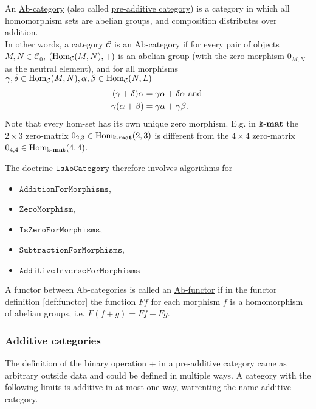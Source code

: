 \begin{definition}[Ab-category]
An \ul{Ab-category} (also called \ul{pre-additive category}) is a category in which all homomorphism sets are abelian groups,
and composition distributes over addition.\\
In other words, a category $\mathcal{C}$ is an Ab-category if for every pair of objects $M,N \in \mathcal{C}_{0}$,
$( \textup{Hom}_{\mathcal{C}}(M,N), + )$ is an abelian group (with the zero morphism $0_{M,N}$ as the neutral element),
and for all morphisms $\gamma, \delta \in \mathrm{Hom}_{\mathcal{C}}(M,N),
\alpha, \beta \in \textup{Hom}_{\mathcal{C}}(N,L)$
\begin{align}
(\gamma + \delta)\alpha &=\label{eq:dist1} \gamma\alpha + \delta\alpha \textup{ and }\\
\gamma(\alpha+\beta) &=\label{eq:dist2} \gamma\alpha + \gamma\beta.
\end{align}
Note that every hom-set has its own unique zero morphism. E.g. in $\Bbbk\textnormal{-}\mathbf{mat}$ the $2 \times 3$ zero-matrix
$0_{2,3} \in \textup{Hom}_{\Bbbk\textnormal{-}\mathbf{mat}}(2,3)$ is different from the $4 \times 4$ zero-matrix $0_{4,4} \in \textup{Hom}_{\Bbbk\textnormal{-}\mathbf{mat}}(4,4)$.
\end{definition}

\begin{doctrine}[Ab-category]\label{doc:ab-category}
The doctrine $\mathtt{IsAbCategory}$ therefore involves algorithms for
\begin{itemize}
\item $\mathtt{AdditionForMorphisms}$,
\item $\mathtt{ZeroMorphism}$,
\item $\mathtt{IsZeroForMorphisms}$,
\item $\mathtt{SubtractionForMorphisms}$,
\item $\mathtt{AdditiveInverseForMorphisms}$
\end{itemize}
\end{doctrine}

\begin{definition}[Ab-functor]
A functor between Ab-categories is called an \ul{Ab-functor} if in the functor definition \ref{def:functor} the function $Ff$ for each
morphism $f$ is a homomorphism of abelian groups, i.e. $F(f+g) = Ff + Fg$.
\end{definition}

\subsubsection{Additive categories}
The definition of the binary operation $+$ in a pre-additive category came as arbitrary outside data and could be defined
in multiple ways. A category with the following limits is additive in at most one way, warrenting the name additive category.

